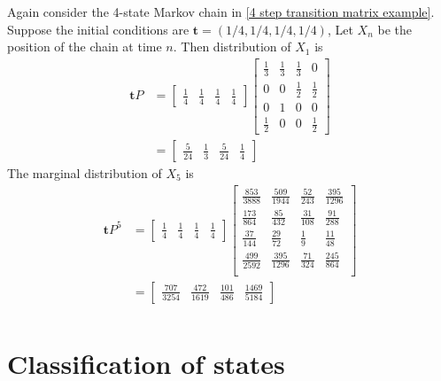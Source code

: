 \begin{example}
    Again consider the 4-state Markov chain in \cref{4 step transition matrix example}. 
    Suppose the initial conditions are $ \mathbf{t} = (1/4,1/4,1/4,1/4) $, Let $ X_{n} $ be the position of the chain at time $ n $. 
    Then distribution of  $ X_{1} $ is
    \begin{align*}
        \mathbf{t}P &= \begin{bmatrix} \frac{1}{4} & \frac{1}{4} & \frac{1}{4} & \frac{1}{4} \end{bmatrix} 
        \begin{bmatrix}
            \frac{1}{3} & \frac{1}{3} & \frac{1}{3} & 0 \\
            0 & 0 & \frac{1}{2} & \frac{1}{2} \\ 
            0 & 1 & 0 & 0 \\ 
            \frac{1}{2} & 0 & 0 & \frac{1}{2} 
        \end{bmatrix}\\
                    &= \begin{bmatrix} \frac{5}{24} & \frac{1}{3} & \frac{5}{24} & \frac{1}{4} \end{bmatrix} 
    \end{align*}
    The marginal distribution of $ X_{5} $ is 
    \begin{align*}
        \mathbf{t}P^{5} &= \begin{bmatrix} \frac{1}{4} & \frac{1}{4} & \frac{1}{4} & \frac{1}{4} \end{bmatrix}
        \begin{bmatrix}
            \frac{853}{3888} & \frac{509}{1944} & \frac{52}{243} & \frac{395}{1296} \\
            \frac{173}{864} & \frac{85}{432} & \frac{31}{108} & \frac{91}{288} \\
            \frac{37}{144} & \frac{29}{72} & \frac{1}{9} & \frac{11}{48} \\
            \frac{499}{2592} & \frac{395}{1296} & \frac{71}{324} & \frac{245}{864} \\
        \end{bmatrix}\\
                        &= \begin{bmatrix}
                            \frac{707}{3254} & \frac{472}{1619} & \frac{101}{486} & \frac{1469}{5184}
                        \end{bmatrix} \\
    \end{align*}
\end{example}

\section{Classification of states}
